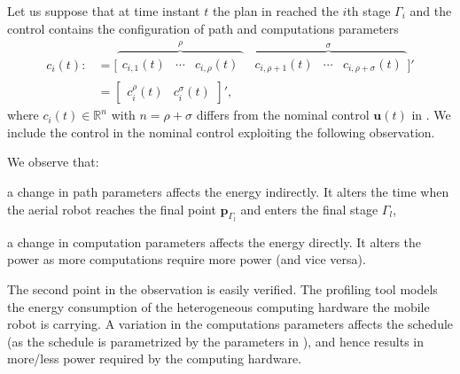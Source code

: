 Let us suppose that at time instant $t$ the plan in  reached the $i$th stage $\Gamma_i$ and the control contains the configuration of path and computations parameters 
\begin{equation}\label{eq:state-control2}\begin{split}
  c_i(t):&=\Big[\overbrace{\begin{matrix}c_{i,1}(t)&\cdots&c_{i,\rho}(t)\end{matrix}}^{\rho} \,\,\, \overbrace{\begin{matrix}c_{i,\rho+1}(t)&\cdots&c_{i,\rho+\sigma}(t)\end{matrix}}^{\sigma}\Big]'\\
  &=\begin{bmatrix}c_i^\rho(t) & c_i^\sigma(t)\end{bmatrix}',
\end{split}\end{equation}
where $c_i(t)\in\mathbb{R}^n$ with $n=\rho+\sigma$ differs from the nominal control $\mathbf{u}(t)$ in . We include the control in the nominal control exploiting the following observation. 

\begin{obs}
  We observe that:
  \begin{enumerate*}[label={(\alph*)},font={\textit}]
    \item a change in path parameters affects the energy indirectly. It alters the time when the aerial robot reaches the final point $\mathbf{p}_{\Gamma_l}$ and enters the final stage $\Gamma_l$,
    \item a change in computation parameters affects the energy directly. It alters the power as more computations require more power (and vice versa).
  \end{enumerate*}
\end{obs}

The second point in the observation is easily verified. The \powprof{} profiling tool models the energy consumption of the heterogeneous computing hardware the mobile robot is carrying. A variation in the computations parameters affects the schedule (as the schedule is parametrized by the parameters in ), and hence results in more/less power required by the computing hardware.

